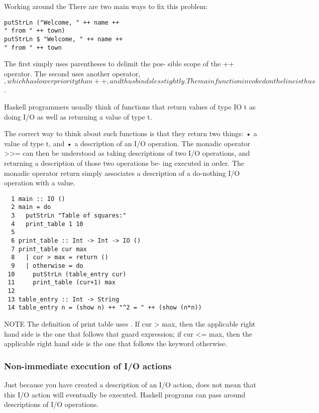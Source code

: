 Working around the 
There are two main ways to fix this problem:
\begin{lstlisting}
putStrLn ("Welcome, " ++ name ++
" from " ++ town)
putStrLn $ "Welcome, " ++ name ++
" from " ++ town
\end{lstlisting}
The first simply uses parentheses to delimit the pos-
sible scope of the ++ operator.
The second uses another operator, $, which has
lower priority than ++, and thus binds less tightly.
The main function invoked on the line is thus
$. 

Haskell programmers usually think of functions
that return values of type IO t as doing I/O as
well as returning a value of type t.

The correct way to think about such functions is
that they return two things:
• a value of type t, and
• a description of an I/O operation.
The monadic operator >>= can then be understood
as taking descriptions of two I/O operations, and
returning a description of those two operations be-
ing executed in order.
The monadic operator return simply associates a
description of a do-nothing I/O operation with a
value.
\begin{lstlisting}
  1 main :: IO ()
  2 main = do
  3   putStrLn "Table of squares:"
  4   print_table 1 10
  5
  6 print_table :: Int -> Int -> IO ()
  7 print_table cur max
  8   | cur > max = return ()
  9   | otherwise = do
 10     putStrLn (table_entry cur)
 11     print_table (cur+1) max
 12
 13 table_entry :: Int -> String
 14 table_entry n = (show n) ++ "^2 = " ++ (show (n*n))
\end{lstlisting}

NOTE The definition of print table uses .
If cur > max, then the applicable right hand side
is the one that follows that guard expression; if cur
<= max, then the applicable right hand side is the
one that follows the keyword otherwise.

\subsubsection{Non-immediate execution of I/O actions}
Just because you have created a description of an
I/O action, does not mean that this I/O action will
eventually be executed.
Haskell programs can pass around descriptions of
I/O operations. 


